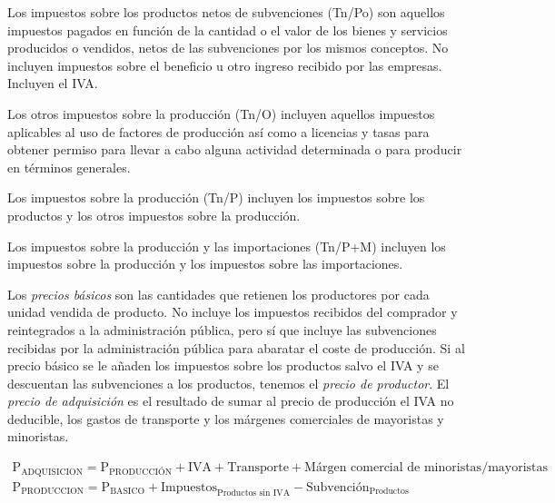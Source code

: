 \documentclass{nuevotema}
\begin{document}
\conceptos



Los impuestos sobre los productos netos de subvenciones (Tn/Po) son aquellos impuestos pagados en función de la cantidad o el valor de los bienes y servicios producidos o vendidos, netos de las subvenciones por los mismos conceptos. No incluyen impuestos sobre el beneficio u otro ingreso recibido por las empresas. Incluyen el IVA.

Los otros impuestos sobre la producción (Tn/O) incluyen aquellos impuestos aplicables al uso de factores de producción así como a licencias y tasas para obtener permiso para llevar a cabo alguna actividad determinada o para producir en términos generales. 

Los impuestos sobre la producción (Tn/P) incluyen los impuestos sobre los productos y los otros impuestos sobre la producción.

Los impuestos sobre la producción y las importaciones (Tn/P+M) incluyen los impuestos sobre la producción y los impuestos sobre las importaciones.


Los \textit{precios básicos} son las cantidades que retienen los productores por cada unidad vendida de producto. No incluye los impuestos recibidos del comprador y reintegrados a la administración pública, pero sí que incluye las subvenciones recibidas por la administración pública para abaratar el coste de producción. Si al precio básico se le añaden los impuestos sobre los productos salvo el IVA y se descuentan las subvenciones a los productos, tenemos el \textit{precio de productor}. El \textit{precio de adquisición} es el resultado de sumar al precio de producción el IVA no deducible, los gastos de transporte y los márgenes comerciales de mayoristas y minoristas.

\begin{align*}
\text{P}_\text{ADQUISICION} = \text{P}_\text{PRODUCCIÓN} + \text{IVA} + \text{Transporte} + \text{Márgen comercial de minoristas/mayoristas} \\
\text{P}_\text{PRODUCCION} = \text{P}_\text{BASICO} + \text{Impuestos}_\text{Productos sin IVA} - \text{Subvención}_\text{Productos}
\end{align*}


\preguntas
\end{document}
